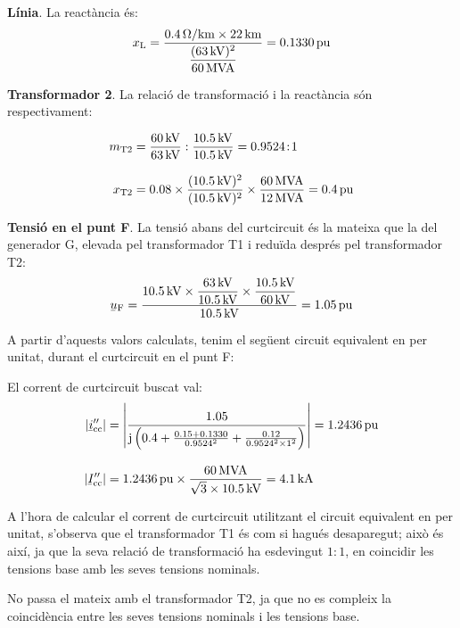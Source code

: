 \begin{exemple}[\MetodeCalculPU{}]
    \textbf{Línia}. La reactància és:
    \[
    x_\mathrm{L} = \frac{\qty{0,4}{\ohm/km} \times \qty{22}{km}} {\dfrac{(\qty{63}{kV})^2}{\qty{60}{MVA}}}  =
    \qty{0,1330}{pu}
    \]

    \textbf{Transformador 2}. La relació de transformació i la reactància són respectivament:

    \begin{align*}
    m_\mathrm{T2} &= \frac{\qty{60}{kV}}{\qty{63}{kV}} :
    \frac{\qty{10,5}{kV}}{\qty{10,5}{kV}} = \num{0,9524}\!:\!1 \\[3mm]
    x_\mathrm{T2} &= \num{0,08} \times \frac{(\qty{10,5}{kV})^2}{(\qty{10,5}{kV})^2} \times
    \frac{\qty{60}{MVA}}{\qty{12}{MVA}}  = \qty{0,4}{pu}
    \end{align*}

    \textbf{Tensió en el punt F}. La tensió abans del curtcircuit és la mateixa que la del generador G, elevada pel transformador T1 i reduïda després pel transformador T2:
    \[
    \cmplx{u}\ped{F} = \frac{\qty{10,5}{kV} \times
    \dfrac{\qty{63}{kV}}{\qty{10,5}{kV}} \times
    \dfrac{\qty{10,5}{kV}}{\qty{60}{kV}}}{\qty{10,5}{kV}} = \qty{1,05}{pu}
    \]

    A partir d'aquests valors calculats, tenim el següent circuit equivalent en per unitat, durant el
    curtcircuit en el punt F:

    \begin{center}
       
    \end{center}

    El corrent de curtcircuit buscat val:
    \begin{align*}
    |\cmplx{i}''\ped{cc}| &= \left| \frac{\num{1,05}}{\ju \left( \num{0,4} + \frac{\num{0,15} + \num{0,1330}}{\num{0,9524}^2} + \frac{\num{0,12}}{\num{0,9524}^2 \times 1^2} \right)} \right| =
     \qty{1,2436}{pu} \\[3mm]
     |\cmplx{I}''\ped{cc}| &= \qty{1,2436}{pu}\times\frac{\qty{60}{MVA}}{\sqrt{3}\times \qty{10,5}{kV}} =
     \qty{4,1}{kA}
    \end{align*}

     A l'hora de calcular el corrent de curtcircuit utilitzant el circuit equivalent en per unitat,
     s'observa que el transformador T1 és com si hagués desaparegut;
     això és així, ja que la seva relació de transformació ha esdevingut
     $1\!:\!1$, en coincidir les tensions base amb les seves tensions nominals.

     No passa el mateix amb el transformador T2, ja que no es compleix
     la coincidència entre les seves tensions nominals i les tensions
     base.


\end{exemple}
